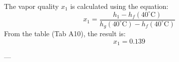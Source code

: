 The vapor quality \( x_1 \) is calculated using the equation:  
\[
x_1 = \frac{h_1 - h_f(40^\circ\text{C})}{h_g(40^\circ\text{C}) - h_f(40^\circ\text{C})}
\]  
From the table (Tab A10), the result is:  
\[
x_1 = 0.139
\]  

---
